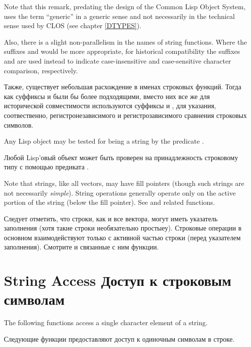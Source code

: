 \begin{new}
Note that this remark, predating the design of the Common Lisp Object System,
uses the term ``generic'' in a generic sense and not necessarily
in the technical sense used by CLOS
(see chapter \ref{DTYPES}).
\end{new}

Also, there is a slight non-parallelism in the names of string functions.
Where the suffixes  and  would be more appropriate,
for historical compatibility the suffixes  and \cdf{=} are used instead
to indicate case-insensitive and case-sensitive character comparison,
respectively.

Также, существует небольшая расхождение в именах строковых функций.
Тогда как суффиксы  и  были бы более подходящими, вместо
них все же для исторической совместимости используются суффиксы  и
\cdf{=}, для указания, соотвественно, регистронезависимого и регистрозависимого
сравнения строковых символов.

Any Lisp object may be tested for being a string by
the predicate .

Любой Lisp'овый объект может быть проверен на принадлежность строковому типу с
помощью предиката .

Note that strings, like all vectors, may have fill pointers
(though such strings are not necessarily \emph{simple}).
String operations generally operate only on the active portion of the string
(below the fill pointer).  See  and related
functions.

Следует отметить, что строки, как и все вектора, могут иметь указатель
заполнения (хотя такие строки необязательно простыеу).
Строковые операции в основном взаимодействуют только с активной частью строки
(перед указателем заполнения). Смотрите  и связанные с ним
функции.

\section{String Access Доступ к строковым символам}

The following functions access a single character element of a string.

Следующие функции предоставляют доступ к одиночным символам в строке.

